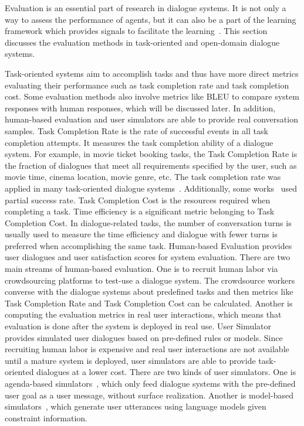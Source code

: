 \label{Evaluation Approaches}
Evaluation is an essential part of research in dialogue systems. It is not only a way to assess the performance of agents, but it can also be a part of the learning framework which provides signals to facilitate the learning~. This section discusses the evaluation methods in task-oriented and open-domain dialogue systems.

\label{Evaluation Methods for Task-oriented Dialogue Systems}
Task-oriented systems aim to accomplish tasks and thus have more direct metrics evaluating their performance such as task completion rate and task completion cost. Some evaluation methods also involve metrics like BLEU to compare system responses with human responses, which will be discussed later. In addition, human-based evaluation and user simulators are able to provide real conversation samples. 
Task Completion Rate is the rate of successful events in all task completion attempts. It measures the task completion ability of a dialogue system. For example, in movie ticket booking tasks, the Task Completion Rate is the fraction of dialogues that meet all requirements specified by the user, such as movie time, cinema location, movie genre, etc. The task completion rate was applied in many task-oriented dialogue systems~. Additionally, some works~ used partial success rate. 
Task Completion Cost is the resources required when completing a task. Time efficiency is a significant metric belonging to Task Completion Cost. In dialogue-related tasks, the number of conversation turns is usually used to measure the time efficiency and dialogue with fewer turns is preferred when accomplishing the same task. 
Human-based Evaluation provides user dialogues and user satisfaction scores for system evaluation. There are two main streams of human-based evaluation. One is to recruit human labor via crowdsourcing platforms to test-use a dialogue system. The crowdsource workers converse with the dialogue systems about predefined tasks and then metrics like Task Completion Rate and Task Completion Cost can be calculated. Another is computing the evaluation metrics in real user interactions, which means that evaluation is done after the system is deployed in real use. 
User Simulator provides simulated user dialogues based on pre-defined rules or models. Since recruiting human labor is expensive and real user interactions are not available until a mature system is deployed, user simulators are able to provide task-oriented dialogues at a lower cost. There are two kinds of user simulators. One is agenda-based simulators~, which only feed dialogue systems with the pre-defined user goal as a user message, without surface realization. Another is model-based simulators~, which generate user utterances using language models given constraint information.


